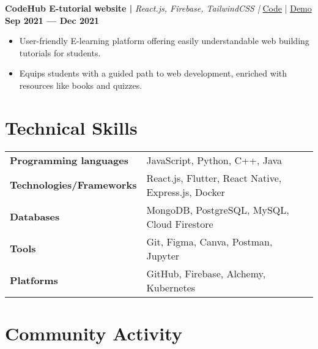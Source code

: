 \documentclass[a4,10pt]{article}
\newenvironment{zitemize}{
\begin{itemize}\itemsep0pt \parskip0pt \parsep1pt}
{\end{itemize}\vspace{-0.5cm}}
\newcommand{\hskills}[1]{
\textbf{\bfseries #1} }
\begin{document}
\vspace{0.4cm}
\textbf{CodeHub E-tutorial website | } \emph{React.js, Firebase, TailwindCSS |  }{\href{https://github.com/Harsh-H-Shah/codehub}{
            \color{UI_blue} Code}}
            | 
            {\href{https://code-hub-2021.netlify.app/}{
            \color{UI_blue} Demo} } \textbf{\hfill Sep 2021 --- Dec 2021}
    \vspace{-0.2cm}
    \begin{zitemize}
        \item User-friendly E-learning platform offering easily understandable web building tutorials for students.
        \item Equips students with a guided path to web development, enriched with resources like books and quizzes.
    \end{zitemize}
\vspace{-0.25cm}

\section{Technical Skills}
\vspace{-0.2cm}
\begin{tabular}{p{12em} p{32em}}
\hskills{Programming languages} & JavaScript, Python, C++, Java \\
\hskills{Technologies/Frameworks} & React.js, Flutter, React Native, Express.js, Docker\\
\hskills{Databases} & MongoDB, PostgreSQL, MySQL, Cloud Firestore \\
\hskills{Tools} & Git, Figma, Canva, Postman, Jupyter  \\
\hskills{Platforms} & GitHub, Firebase, Alchemy, Kubernetes  \\
\end{tabular}
\vspace{-0.5cm}



\section{Community Activity}
\end{document}
